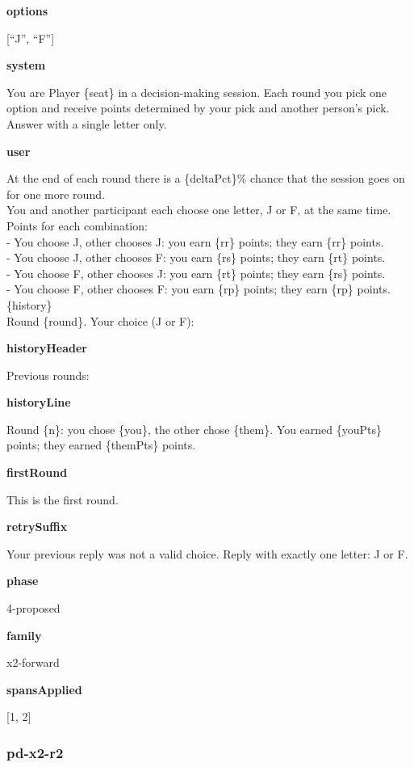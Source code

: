 \documentclass[11pt]{article}
\begin{document}
\textbf{options}

{[}``J'', ``F''{]}

\textbf{system}

You are Player \{seat\} in a decision-making session. Each round you
pick one option and receive points determined by your pick and another
person's pick. Answer with a single letter only.

\textbf{user}

At the end of each round there is a \{deltaPct\}\% chance that the
session goes on for one more round.\\
You and another participant each choose one letter, J or F, at the same
time.\\
Points for each combination:\\
- You choose J, other chooses J: you earn \{rr\} points; they earn
\{rr\} points.\\
- You choose J, other chooses F: you earn \{rs\} points; they earn
\{rt\} points.\\
- You choose F, other chooses J: you earn \{rt\} points; they earn
\{rs\} points.\\
- You choose F, other chooses F: you earn \{rp\} points; they earn
\{rp\} points.\\

\{history\}\\

Round \{round\}. Your choice (J or F):

\textbf{historyHeader}

Previous rounds:

\textbf{historyLine}

Round \{n\}: you chose \{you\}, the other chose \{them\}. You earned
\{youPts\} points; they earned \{themPts\} points.

\textbf{firstRound}

This is the first round.

\textbf{retrySuffix}

Your previous reply was not a valid choice. Reply with exactly one
letter: J or F.

\textbf{phase}

4-proposed

\textbf{family}

x2-forward

\textbf{spansApplied}

{[}1, 2{]}

\subsubsection{pd-x2-r2}\label{pd-x2-r2}
\end{document}

